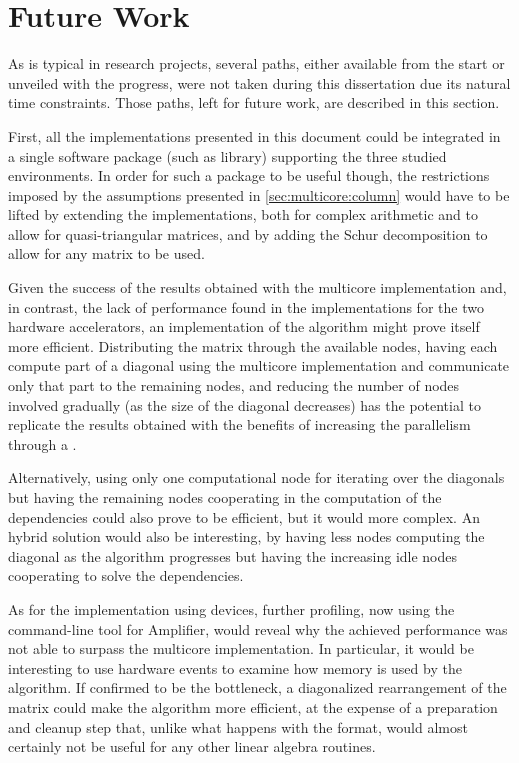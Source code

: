 \documentclass[../thesis]{subfiles}
\begin{document}
	\section{Future Work}
	\label{sec:conclusions:futurework}

	As is typical in research projects, several paths, either available from the start or unveiled with the progress, were not taken during this dissertation due its natural time constraints. Those paths, left for future work, are described in this section.

	First, all the implementations presented in this document could be integrated in a single software package (such as \blas library) supporting the three studied environments. In order for such a package to be useful though, the restrictions imposed by the assumptions presented in \cref{sec:multicore:column} would have to be lifted by extending the implementations, both for complex arithmetic and to allow for quasi-triangular matrices, and by adding the Schur decomposition to allow for any matrix to be used.

	Given the success of the results obtained with the multicore implementation and, in contrast, the lack of performance found in the implementations for the two hardware accelerators, an \mpi implementation of the algorithm might prove itself more efficient. Distributing the matrix through the available nodes, having each compute part of a diagonal using the multicore implementation and communicate only that part to the remaining nodes, and reducing the number of nodes involved gradually (as the size of the diagonal decreases) has the potential to replicate the results obtained with the benefits of increasing the parallelism through a \hetplat.

	Alternatively, using only one computational node for iterating over the diagonals but having the remaining nodes cooperating in the computation of the dependencies could also prove to be efficient, but it would more complex. An hybrid solution would also be interesting, by having less nodes computing the diagonal as the algorithm progresses but having the increasing idle nodes cooperating to solve the dependencies.

	As for the implementation using \intel\mic devices, further profiling, now using the command-line tool for \intel\vtune Amplifier, would reveal why the achieved performance was not able to surpass the multicore implementation. In particular, it would be interesting to use hardware events to examine how memory is used by the algorithm. If confirmed to be the bottleneck, a diagonalized rearrangement of the matrix could make the algorithm more efficient, at the expense of a preparation and cleanup step that, unlike what happens with the \usb format, would almost certainly not be useful for any other linear algebra routines.
\end{document}

